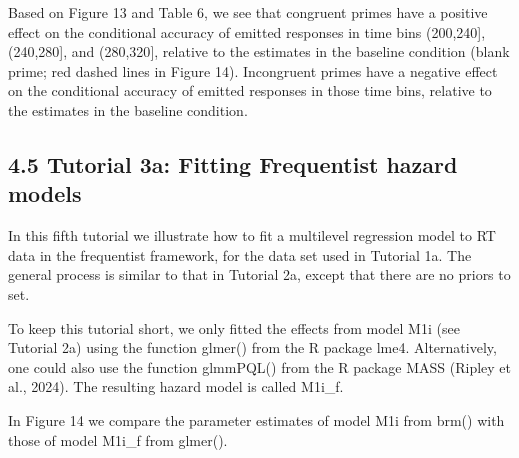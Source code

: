 \documentclass[
  man, donotrepeattitle,floatsintext]{apa6}
\begin{document}
\begin{center}
\begin{ThreePartTable}
\end{ThreePartTable}
\end{center}

Based on Figure 13 and Table 6, we see that congruent primes have a positive effect on the conditional accuracy of emitted responses in time bins (200,240{]}, (240,280{]}, and (280,320{]}, relative to the estimates in the baseline condition (blank prime; red dashed lines in Figure 14).
Incongruent primes have a negative effect on the conditional accuracy of emitted responses in those time bins, relative to the estimates in the baseline condition.

\subsection{4.5 Tutorial 3a: Fitting Frequentist hazard models}\label{tutorial-3a-fitting-frequentist-hazard-models}

In this fifth tutorial we illustrate how to fit a multilevel regression model to RT data in the frequentist framework, for the data set used in Tutorial 1a. The general process is similar to that in Tutorial 2a, except that there are no priors to set.

To keep this tutorial short, we only fitted the effects from model M1i (see Tutorial 2a) using the function glmer() from the R package lme4. Alternatively, one could also use the function glmmPQL() from the R package MASS (Ripley et al., 2024). The resulting hazard model is called M1i\_f.

In Figure 14 we compare the parameter estimates of model M1i from brm() with those of model M1i\_f from glmer().
\end{document}
